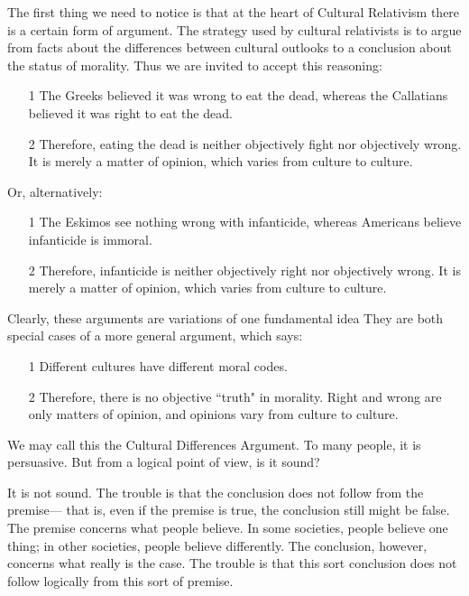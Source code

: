 The first thing we need to notice is that at the heart of Cultural Relativism 
there  is  a  certain  form  of  argument.  The  strategy  used  by  cultural 
relativists  is  to  argue  from  facts  about  the  differences  between  cultural 
outlooks to a conclusion about the status of morality. Thus we are invited 
to accept this reasoning: 
\begin{enumerate}
\item[1] The Greeks believed it was wrong to eat the dead, 
whereas  the  Callatians  believed  it  was  right  to  eat  the 
dead. 
\item[2] Therefore,  eating  the  dead  is  neither  objectively  fight  nor 
objectively  wrong.  It  is  merely  a  matter  of  opinion,  which 
varies from culture to culture. 
\end{enumerate}
Or, alternatively:
\begin{enumerate} 
\item[1] The  Eskimos  see  nothing  wrong  with  infanticide,  whereas 
Americans believe infanticide is immoral. 
\item[2] Therefore, infanticide is neither objectively right nor 
objectively  wrong.  It  is  merely  a  matter  of  opinion,  which 
varies from culture to culture. 
\end{enumerate}
Clearly,  these  arguments  are  variations  of  one  fundamental  idea  They 
are both special cases of a more general argument, which says: 
\begin{enumerate}
\item[1] Different cultures have different moral codes. 
\item[2] Therefore,  there  is  no  objective  ``truth"  in  morality.  Right 
and  wrong  are  only  matters  of  opinion,  and  opinions  vary 
from culture to culture. 
\end{enumerate}
We may call this  the Cultural Differences  Argument. To many people, it 
is persuasive. But from a logical point of view, is it sound?

It  is  not  sound.  The  trouble  is  that  the  conclusion  does  not  follow  from 
the  premise— that  is,  even  if  the  premise  is  true,  the  conclusion  still 
might  be  false.  The  premise  concerns  what  people  believe.  In  some 
societies,  people  believe  one  thing;  in  other  societies,  people  believe 
differently.  The  conclusion,  however,  concerns  what  really  is  the  case. 
The trouble is that this sort conclusion does not follow logically from this 
sort of premise. 

